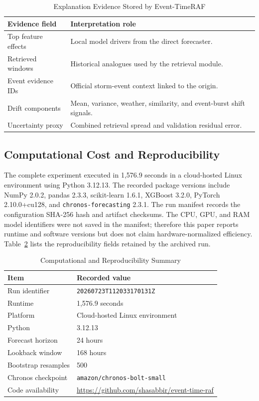 \begin{table}[!t]
\centering
\caption{Explanation Evidence Stored by Event-TimeRAF}
\label{tab:explainability_outputs}
\begin{tabular}{p{}p{}}
\toprule
Evidence field & Interpretation role \\
\midrule
Top feature effects & Local model drivers from the direct forecaster. \\
Retrieved windows & Historical analogues used by the retrieval module. \\
Event evidence IDs & Official storm-event context linked to the origin. \\
Drift components & Mean, variance, weather, similarity, and event-burst shift signals. \\
Uncertainty proxy & Combined retrieval spread and validation residual error. \\
\bottomrule
\end{tabular}
\end{table}

\subsection{Computational Cost and Reproducibility}

The complete experiment executed in 1,576.9 seconds in a cloud-hosted Linux
environment using Python 3.12.13. The recorded package versions include
NumPy 2.0.2, pandas 2.3.3, scikit-learn 1.6.1, XGBoost 3.2.0, PyTorch
2.10.0+cu128, and \texttt{chronos-forecasting} 2.3.1. The run manifest records
the configuration SHA-256 hash and artifact checksums. The CPU, GPU, and RAM
model identifiers were not saved in the manifest; therefore this paper reports
runtime and software versions but does not claim hardware-normalized efficiency.
Table~\ref{tab:compute_summary} lists the reproducibility fields retained by
the archived run.

\begin{table}[!t]
\centering
\caption{Computational and Reproducibility Summary}
\label{tab:compute_summary}
\begin{tabular}{ll}
\toprule
Item & Recorded value \\
\midrule
Run identifier & \texttt{20260723T112033170131Z} \\
Runtime & 1,576.9 seconds \\
Platform & Cloud-hosted Linux environment \\
Python & 3.12.13 \\
Forecast horizon & 24 hours \\
Lookback window & 168 hours \\
Bootstrap resamples & 500 \\
Chronos checkpoint & \texttt{amazon/chronos-bolt-small} \\
Code availability & \url{https://github.com/shasabbir/event-time-raf} \\
\bottomrule
\end{tabular}
\end{table}

